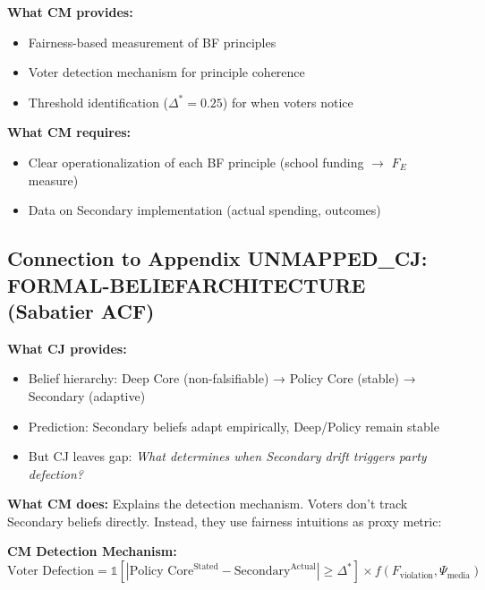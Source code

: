 \begin{tcolorbox}[colback=yellow!5!white, colframe=yellow!75!black,
    title=Integration: Appendix UNMAPPED_CM $\leftrightarrow$ Appendix GEN]

\textbf{What CM provides:}
\begin{itemize}[nosep]
\item Fairness-based measurement of BF principles
\item Voter detection mechanism for principle coherence
\item Threshold identification ($\Delta^* = 0.25$) for when voters notice
\end{itemize}

\textbf{What CM requires:}
\begin{itemize}[nosep]
\item Clear operationalization of each BF principle (school funding $\rightarrow$ $F_E$ measure)
\item Data on Secondary implementation (actual spending, outcomes)
\end{itemize}

\end{tcolorbox}

\subsection{Connection to Appendix UNMAPPED_CJ: FORMAL-BELIEFARCHITECTURE (Sabatier ACF)}

\textbf{What CJ provides:}
\begin{itemize}[nosep]
\item Belief hierarchy: Deep Core (non-falsifiable) → Policy Core (stable) → Secondary (adaptive)
\item Prediction: Secondary beliefs adapt empirically, Deep/Policy remain stable
\item But CJ leaves gap: \textit{What determines when Secondary drift triggers party defection?}
\end{itemize}

\textbf{What CM does:}
Explains the detection mechanism. Voters don't track Secondary beliefs directly. Instead,
they use fairness intuitions as proxy metric:

\textbf{CM Detection Mechanism:}
\begin{equation}
\text{Voter Defection} = \mathbb{1}[|\text{Policy Core}^{\text{Stated}} - \text{Secondary}^{\text{Actual}}| \geq \Delta^*] \times f(F_{\text{violation}}, \Psi_{\text{media}})
\end{equation}

